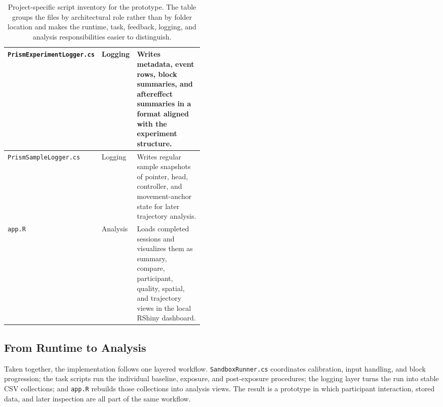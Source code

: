 \begin{table}[H]
\begin{tabularx}{\linewidth}{|
        >{\raggedright\arraybackslash}p{0.27\linewidth}|
        >{\raggedright\arraybackslash}p{0.18\linewidth}|
        X|
    }
        \hline
        \texttt{PrismExperimentLogger.cs} & Logging & Writes metadata, event rows, block summaries, and aftereffect summaries in a format aligned with the experiment structure. \\
        \hline
        \texttt{PrismSampleLogger.cs} & Logging & Writes regular sample snapshots of pointer, head, controller, and movement-anchor state for later trajectory analysis. \\
        \hline
        \texttt{app.R} & Analysis & Loads completed sessions and visualizes them as summary, compare, participant, quality, spatial, and trajectory views in the local RShiny dashboard. \\
        \hline
    \end{tabularx}
    \caption{Project-specific script inventory for the prototype. The table groups the files by architectural role rather than by folder location and makes the runtime, task, feedback, logging, and analysis responsibilities easier to distinguish.}
    \label{tab:pegfg-script-inventory}
\end{table}

\subsection{From Runtime to Analysis}
\label{subsec:implementation-overall-workflow}

Taken together, the implementation follows one layered workflow. \texttt{SandboxRunner.cs} coordinates calibration, input handling, and block progression; the task scripts run the individual baseline, exposure, and post-exposure procedures; the logging layer turns the run into stable CSV collections; and \texttt{app.R} rebuilds those collections into analysis views. The result is a prototype in which participant interaction, stored data, and later inspection are all part of the same workflow.

